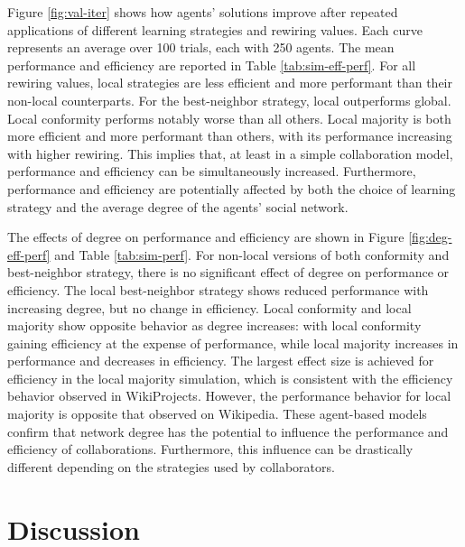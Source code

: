 \documentclass[letterpaper,twocolumn,10pt]{article}
\newcommand{\+}{\phantom{-}}
\begin{document}
Figure \ref{fig:val-iter} shows how agents' solutions improve after repeated applications of
different learning strategies and rewiring values.
Each curve represents an average over 100 trials, each with 250 agents.
The mean performance and efficiency are reported in Table \ref{tab:sim-eff-perf}.
For all rewiring values, local strategies are less efficient and more performant
than their non-local counterparts.
For the best-neighbor strategy, local outperforms global.
Local conformity performs notably worse than all others.
Local majority is both more efficient and more performant than others,
with its performance increasing with higher rewiring.
This implies that,
at least in a simple collaboration model,
performance and efficiency can be simultaneously increased.
Furthermore, performance and efficiency are potentially affected by both the choice of
learning strategy and the average degree of the agents' social network.

The effects of degree on performance and efficiency are shown in Figure \ref{fig:deg-eff-perf} and
Table \ref{tab:sim-perf}.
For non-local versions of both conformity and best-neighbor strategy,
there is no significant effect of degree on performance or efficiency.
The local best-neighbor strategy shows reduced performance with increasing degree,
but no change in efficiency.
Local conformity and local majority show opposite behavior as degree increases:
with local conformity gaining efficiency at the expense of performance,
while local majority increases in performance and decreases in efficiency.
The largest effect size is achieved for efficiency in the local majority simulation,
which is consistent with the efficiency behavior observed in WikiProjects.
However, the performance behavior for local majority is opposite that observed on
Wikipedia.
These agent-based models confirm that network degree has the potential to influence
the performance and efficiency of collaborations.
Furthermore, this influence can be drastically different depending on the strategies
used by collaborators.

\section{Discussion}
\label{sec:discuss}
\end{document}
